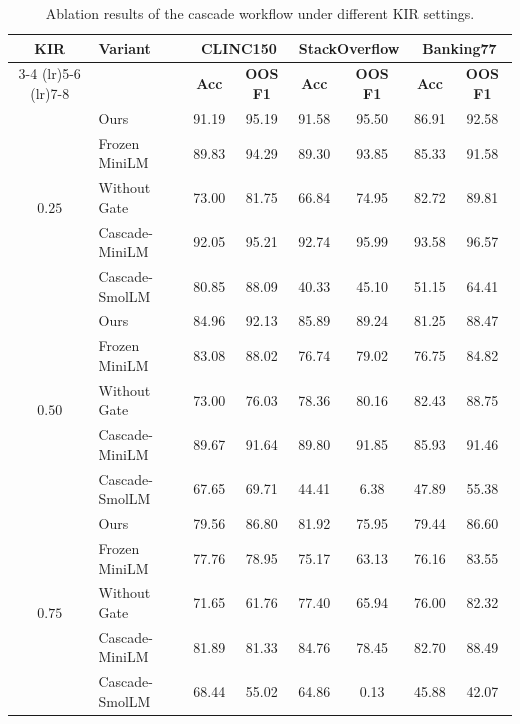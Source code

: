 \documentclass[11pt]{article}
\begin{document}
\begin{table}[t]
\centering
\small
\setlength{\tabcolsep}{0pt}
\renewcommand{\arraystretch}{1.0}
\begin{tabular*}{\textwidth}{@{\extracolsep{\fill}}clcccccc@{}}
\toprule
\multirow{2}{*}{\textbf{KIR}} & \multirow{2}{*}{\textbf{Variant}} & \multicolumn{2}{c}{\textbf{CLINC150}} & \multicolumn{2}{c}{\textbf{StackOverflow}} & \multicolumn{2}{c}{\textbf{Banking77}}\\
\cmidrule(lr){3-4}
\cmidrule(lr){5-6}
\cmidrule(lr){7-8}
& & \textbf{Acc} & \textbf{OOS F1} & \textbf{Acc} & \textbf{OOS F1} & \textbf{Acc} & \textbf{OOS F1}\\
\midrule
\multirow{5}{*}{$0.25$}
& Ours & 91.19 & 95.19 & 91.58 & 95.50 & 86.91 & 92.58\\
& Frozen MiniLM & 89.83 & 94.29 & 89.30 & 93.85 & 85.33 & 91.58\\
& Without Gate & 73.00 & 81.75 & 66.84 & 74.95 & 82.72 & 89.81\\
& Cascade-MiniLM & 92.05 & 95.21 & 92.74 & 95.99 & 93.58 & 96.57\\
& Cascade-SmolLM & 80.85 & 88.09 & 40.33 & 45.10 & 51.15 & 64.41\\
\midrule
\multirow{5}{*}{$0.50$}
& Ours & 84.96 & 92.13 & 85.89 & 89.24 & 81.25 & 88.47\\
& Frozen MiniLM & 83.08 & 88.02 & 76.74 & 79.02 & 76.75 & 84.82\\
& Without Gate & 73.00 & 76.03 & 78.36 & 80.16 & 82.43 & 88.75\\
& Cascade-MiniLM & 89.67 & 91.64 & 89.80 & 91.85 & 85.93 & 91.46\\
& Cascade-SmolLM & 67.65 & 69.71 & 44.41 & 6.38 & 47.89 & 55.38\\
\midrule
\multirow{5}{*}{$0.75$}
& Ours & 79.56 & 86.80 & 81.92 & 75.95 & 79.44 & 86.60\\
& Frozen MiniLM & 77.76 & 78.95 & 75.17 & 63.13 & 76.16 & 83.55\\
& Without Gate & 71.65 & 61.76 & 77.40 & 65.94 & 76.00 & 82.32\\
& Cascade-MiniLM & 81.89 & 81.33 & 84.76 & 78.45 & 82.70 & 88.49\\
& Cascade-SmolLM & 68.44 & 55.02 & 64.86 & 0.13 & 45.88 & 42.07\\
\bottomrule
\end{tabular*}
\caption{Ablation results of the cascade workflow under different KIR settings. }
\label{tab:ablation_all_kir}
\end{table}
\end{document}
